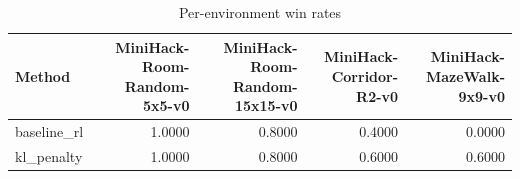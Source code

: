 \begin{table}[htbp]
\centering
\caption{Per-environment win rates}
\label{tab:per-env}
\begin{tabular}{lrrrr}
\toprule
\textbf{Method} & \textbf{MiniHack-Room-Random-5x5-v0} & \textbf{MiniHack-Room-Random-15x15-v0} & \textbf{MiniHack-Corridor-R2-v0} & \textbf{MiniHack-MazeWalk-9x9-v0} \\
\midrule
baseline\_rl & 1.0000 & 0.8000 & 0.4000 & 0.0000 \\
kl\_penalty & 1.0000 & 0.8000 & 0.6000 & 0.6000 \\
\bottomrule
\end{tabular}
\end{table}